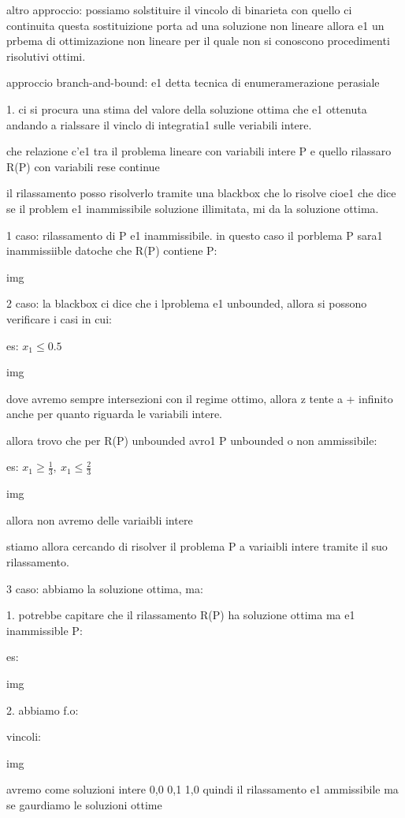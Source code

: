 altro approccio:
possiamo solstituire il vincolo di binarieta con quello ci continuita questa sostituizione porta ad una soluzione non lineare allora e1 un prbema di ottimizazione non lineare per il quale non si conoscono procedimenti risolutivi ottimi.



approccio branch-and-bound:
e1 detta tecnica di enumeramerazione perasiale

1. ci si procura una stima del valore della soluzione ottima che e1 ottenuta andando a rialssare il vinclo di integratia1 sulle veriabili intere. 

che relazione c'e1 tra il problema lineare con variabili intere P e quello rilassaro R(P) con variabili rese continue

il rilassamento posso risolverlo tramite una blackbox che lo risolve cioe1 che dice se il problem e1 inammissibile soluzione illimitata, mi da la soluzione ottima. 


1 caso: rilassamento di P e1 inammissibile. in questo caso il porblema P sara1 inammissiible datoche che R(P) contiene P:

img

2 caso: la blackbox ci dice che i lproblema e1 unbounded, allora si possono verificare i casi in cui:

es: $x_1 \leq 0.5$

img

dove avremo sempre intersezioni con il regime ottimo, allora z tente a + infinito anche per quanto riguarda le variabili intere.

allora trovo che per R(P) unbounded avro1 P unbounded o non ammissibile:

es: $x_1 \geq \frac{1}{3},\ x_1 \leq \frac{2}{3}$

img

allora non avremo delle variaibli intere




stiamo allora cercando di risolver il problema P a variaibli intere tramite il suo rilassamento.

3 caso: abbiamo la soluzione ottima, ma:

1. potrebbe capitare che il rilassamento R(P) ha soluzione ottima ma e1 inammissible P:

es:

img

2. abbiamo f.o:

vincoli:

img

avremo come soluzioni intere 0,0 0,1 1,0 quindi il rilassamento e1 ammissibile ma se gaurdiamo le soluzioni ottime 


